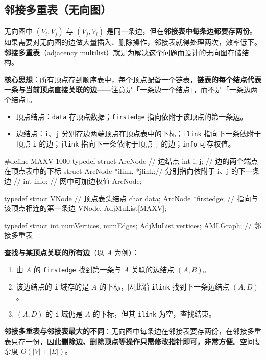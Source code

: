 \documentclass[11pt,openany,UTF8]{ctexbook}
\begin{document}
\subsection{邻接多重表（无向图）}

无向图中 $(V_i,V_j)$ 与 $(V_j,V_i)$ 是同一条边，但在\textbf{邻接表中每条边都要存两份}。如果需要对无向图的边做大量插入、删除操作，邻接表就得处理两次，效率低下。\textbf{邻接多重表}（adjacency multilist）就是为解决这个问题而设计的无向图存储结构。

\textbf{核心思想}：所有顶点存到顺序表中，每个顶点配备一个链表，\textbf{链表的每个结点代表一条与当前顶点直接关联的边}——注意是「一条边一个结点」，而不是「一条边两个结点」。

\begin{itemize}
\item 顶点结点：\texttt{data} 存顶点数据；\texttt{firstedge} 指向依附于该顶点的第一条边。
\item 边结点：\texttt{i}、\texttt{j} 分别存边两端顶点在顶点表中的下标；\texttt{ilink} 指向下一条依附于顶点 \texttt{i} 的边；\texttt{jlink} 指向下一条依附于顶点 \texttt{j} 的边；\texttt{info} 可存权值。
\end{itemize}
\begin{codebox}
#define MAXV 1000
typedef struct ArcNode {          // 边结点
    int i, j;                     // 边的两个端点在顶点表中的下标
    struct ArcNode *ilink, *jlink;// 分别指向依附于 i、j 的下一条边
    // int info;                  // 网中可加边权值
} ArcNode;

typedef struct VNode {            // 顶点表头结点
    char data;
    ArcNode *firstedge;           // 指向与该顶点相连的第一条边
} VNode, AdjMuList[MAXV];

typedef struct {
    int numVertices, numEdges;
    AdjMuList vertices;
} AMLGraph;                       // 邻接多重表
\end{codebox}

\textbf{查找与某顶点关联的所有边}（以 $A$ 为例）：

\begin{enumerate}
\item 由 $A$ 的 \texttt{firstedge} 找到第一条与 $A$ 关联的边结点 $(A,B)$。
\item 该边结点的 \texttt{i} 域存的是 $A$ 的下标，因此沿 \texttt{ilink} 找到下一条边结点 $(A,D)$。
\item $(A,D)$ 的 \texttt{i} 域仍是 $A$ 的下标，但其 \texttt{ilink} 为空，查找结束。
\end{enumerate}
\textbf{邻接多重表与邻接表最大的不同}：无向图中每条边在邻接表要存两份，在邻接多重表只存一份，因此\textbf{删除边、删除顶点等操作只需修改指针即可，非常方便}。空间复杂度 $O(|V|+|E|)$。
\end{document}
